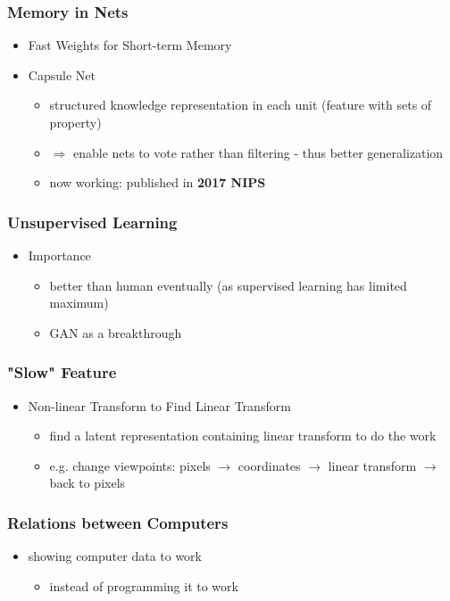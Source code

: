 \subsubsection{Memory in Nets}
\begin{itemize}
\item Fast Weights for Short-term Memory
\item Capsule Net
	\begin{itemize}
	\item structured knowledge representation in each unit (feature with sets of property)
	\item $\Rightarrow$ enable nets to vote rather than filtering - thus better generalization
	\item now working: published in \textbf{2017 NIPS}
	\end{itemize}
\end{itemize}

\subsubsection{Unsupervised Learning}
\begin{itemize}
\item Importance
	\begin{itemize}
	\item better than human eventually (as supervised learning has limited maximum)
	\item GAN as a breakthrough
	\end{itemize}
\end{itemize}

\subsubsection{"Slow" Feature}
\begin{itemize}
\item Non-linear Transform to Find Linear Transform
	\begin{itemize}
	\item find a latent representation containing linear transform to do the work
	\item e.g. change viewpoints: pixels $\rightarrow$ coordinates $\rightarrow$ linear transform $\rightarrow$ back to pixels
	\end{itemize}
\end{itemize}

\subsubsection{Relations between Computers}
\begin{itemize}
\item showing computer data to work
	\begin{itemize}
	\item instead of programming it to work
	\end{itemize}
\end{itemize}


